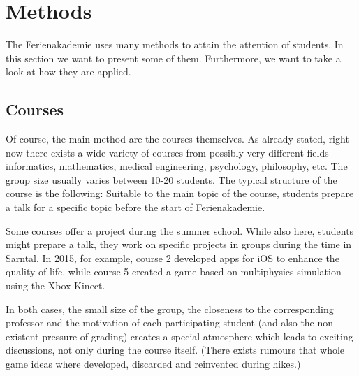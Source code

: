 \section{Methods}
The Ferienakademie uses many methods to attain the attention of students. In this section we want to present some of them. Furthermore, we want to take a look at how they are applied.
\subsection{Courses}
Of course, the main method are the courses themselves. As already stated, right now there exists a wide variety of courses from possibly very different fields-- informatics, mathematics, medical engineering, psychology, philosophy, etc. The group size usually varies between 10-20 students. The typical structure of the course is the following: Suitable to the main topic of the course, students prepare a talk for a specific topic before the start of Ferienakademie. 

Some courses offer a project during the summer school. While also here, students might prepare a talk, they work on specific projects in groups during the time in Sarntal. In 2015, for example, course 2 developed apps for iOS to enhance the quality of life, while course 5 created a game based on multiphysics simulation using the Xbox Kinect. 

In both cases, the small size of the group, the closeness to the corresponding professor and the motivation of each participating student (and also the non-existent pressure of grading) creates a special atmosphere which leads to exciting discussions, not only during the course itself. (There exists rumours that whole game ideas where developed, discarded and reinvented during hikes.)

